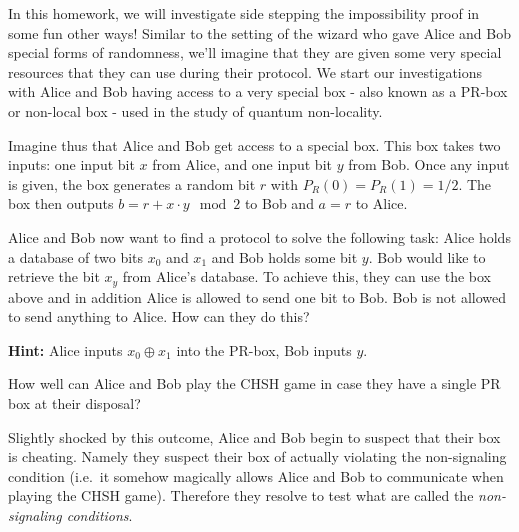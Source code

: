 \documentclass[a4paper,10pt,landscape,twocolumn]{scrartcl}
\begin{document}
\begin{exercise}
In this homework, we will investigate side stepping the impossibility proof in some fun other ways! Similar to the setting of the wizard who gave Alice and Bob special forms of randomness, we'll imagine that they are given some very special resources that they can use during their protocol. We start our investigations with Alice and Bob having access to a very special box - also known as a PR-box or non-local box - used in the study of quantum non-locality. 

Imagine thus that Alice and Bob get access to a special box. This box takes two inputs: one input bit $x$ from Alice, and one input bit $y$ from Bob. Once any input is given, the box generates a random bit $r$ with $P_R(0)=P_R(1)=1/2$. The box then outputs $b=r+ x \cdot y \mod 2$ to Bob and $a=r$ to Alice.

\begin{subex}
Alice and Bob now want to find a protocol to solve the following task: Alice holds a database of two bits $x_0$ and $x_1$ and Bob holds some bit $y$. Bob would like to retrieve the bit $x_y$ from Alice's database. To achieve this, they can use the box above and in addition Alice is allowed to send one bit to Bob. Bob is not allowed to send anything to Alice. How can they do this?

\textbf{Hint: } Alice inputs $x_0 \oplus x_1$ into the PR-box, Bob inputs $y$.
\end{subex}

\begin{subex}
How well can Alice and Bob play the CHSH game in case they have a single PR box at their disposal?
\end{subex}

\begin{subex}
Slightly shocked by this outcome, Alice and Bob begin to suspect that their box is cheating. Namely they suspect their box of actually violating the non-signaling condition (i.e.\ it somehow magically allows Alice and Bob to communicate when playing the CHSH game). Therefore they resolve to test what are called the \emph{non-signaling conditions}. 


\end{subex}
\end{exercise}
\end{document}
